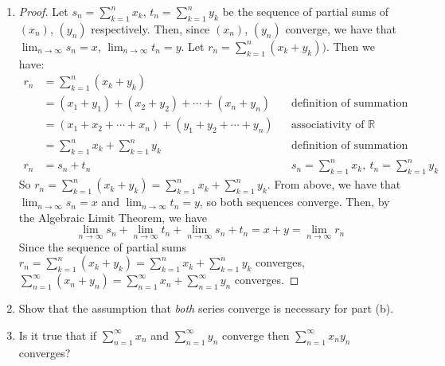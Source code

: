 \documentclass[13pt]{article}
\begin{document}
\begin{enumerate}[label=(\alph*)]
\item
  \begin{proof}
    Let $s_{n} = \sum_{k = 1}^{n} x_{k}$, $t_{n} = \sum_{k = 1}^{n}
    y_{k}$ be the sequence of partial sums of $(x_{n})$, $(y_{n})$
    respectively. Then, since $(x_{n})$, $(y_{n})$ converge, we have
    that $\lim_{n \rightarrow \infty} s_{n} = x$, $\lim_{n \rightarrow
      \infty} t_{n} = y$. Let $r_{n} = \sum_{k = 1}^{n} (x_{k} +
    y_{k}))$. Then we have:
    \begin{align*}
      r_{n} &= \sum_{k = 1}^{n} (x_{k} + y_{k}) \\
            &= (x_{1} + y_{1}) + (x_{2} + y_{2}) + \cdots + (x_{n} +
              y_{n}) && \text{definition of summation} \\
            &= (x_{1} + x_{2} + \cdots + x_{n}) + (y_{1} + y_{2} +
              \cdots + y_{n}) && \text{associativity of } \mathbb{R} \\
            &= \sum_{k = 1}^{n} x_{k} + \sum_{k = 1}^{n} y_{k} &&
                                                                  \text{definition
                                                                  of
                                                                  summation} \\
      r_{n} &= s_{n} + t_{n} && s_{n} = \sum_{k = 1}^{n} x_{k}, \ t_{n}
                                = \sum_{k = 1}^{n} y_{k}
    \end{align*}
    So $r_{n} = \sum_{k = 1}^{n} (x_{k} + y_{k}) = \sum_{k = 1}^{n}
    x_{k} + \sum_{k = 1}^{n} y_{k}$. From above, we have that $\lim_{n
      \rightarrow \infty} s_{n} = x$ and $\lim_{n
      \rightarrow \infty} t_{n} = y$, so both sequences converge. Then,
    by the Algebraic Limit Theorem, we have \[\lim_{n \rightarrow \infty}
      s_{n} + \lim_{n \rightarrow \infty} t_{n} + \lim_{n \rightarrow
        \infty} s_{n} + t_{n} = x + y = \lim_{n \rightarrow \infty}
      r_{n}\] Since the sequence of partial sums $r_{n} = \sum_{k = 1}^{n}
    (x_{k} + y_{k}) = \sum_{k = 1}^{n} x_{k} + \sum_{k = 1}^{n} y_{k}$
    converges, $\sum_{n = 1}^{\infty} (x_{n} + y_{n}) = \sum_{n = 1}^{\infty} x_{n}
    + \sum_{n = 1}^{\infty} y_{n}$ converges.
  \end{proof}
  
\item Show that the assumption that \textit{both} series converge is
  necessary for part (b).
  
\item Is it true that if $\sum_{n = 1}^{\infty} x_{n}$ and $\sum_{n =
    1}^{\infty} y_{n}$ converge then $\sum_{n = 1}^{\infty}
  x_{n}y_{n}$ converges?
\end{enumerate}
\end{document}

